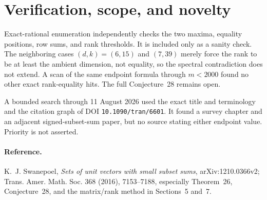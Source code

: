 \documentclass[10pt]{article}
\begin{document}
\section{Verification, scope, and novelty}

Exact-rational enumeration independently checks the two maxima, equality
positions, row sums, and rank thresholds. It is included only as a sanity
check. The neighboring cases $(d,k)=(6,15)$ and $(7,39)$ merely force the
rank to be at least the ambient dimension, not equality, so the spectral
contradiction does not extend. A scan of the same endpoint formula through
$m<2000$ found no other exact rank-equality hits. The full Conjecture~28
remains open.

A bounded search through 11 August 2026 used the exact title and terminology
and the citation graph of DOI \texttt{10.1090/tran/6601}. It found a survey
chapter and an adjacent signed-subset-sum paper, but no source stating either
endpoint value. Priority is not asserted.

\paragraph{Reference.}
K.~J. Swanepoel, \emph{Sets of unit vectors with small subset sums},
arXiv:1210.0366v2; Trans. Amer. Math. Soc. 368 (2016), 7153--7188,
especially Theorem~26, Conjecture~28, and the matrix/rank method in
Sections~5 and~7.
\end{document}
